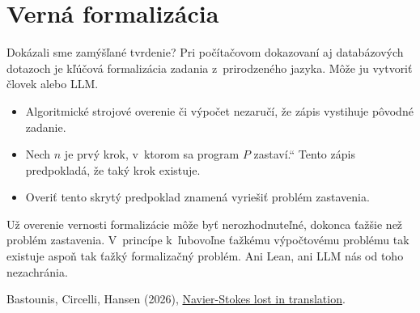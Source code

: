 \documentclass[12pt]{beamer}
\providecommand{\uv}[1]{\quotedblbase #1\textquotedblleft}
\begin{document}
\section{Verná formalizácia}
\begin{frame}{Dokázali sme zamýšľané tvrdenie?}
Pri počítačovom dokazovaní aj databázových dotazoch je kľúčová
\alert{formalizácia zadania z~prirodzeného jazyka}.
Môže ju vytvoriť človek alebo LLM.

\begin{itemize}
  \item Algoritmické strojové overenie či výpočet
    \alert{nezaručí, že zápis vystihuje pôvodné zadanie.}
  \item \uv{Nech $n$ je prvý krok, v~ktorom sa program $P$ zastaví.}
    Tento zápis predpokladá, že taký krok existuje.
  \item Overiť tento skrytý predpoklad znamená vyriešiť
    problém zastavenia.
\end{itemize}

\alert{Už overenie vernosti formalizácie môže byť nerozhodnuteľné,
dokonca ťažšie než problém zastavenia.}
V~princípe k~ľubovoľne ťažkému výpočtovému problému tak existuje aspoň tak ťažký formalizačný problém.
Ani Lean, ani LLM nás od toho nezachránia.

\vfill
{\tiny Bastounis, Circelli, Hansen (2026),
\href{https://arxiv.org/abs/2610.08144}{Navier-Stokes lost in translation}.}
\end{frame}
\end{document}
